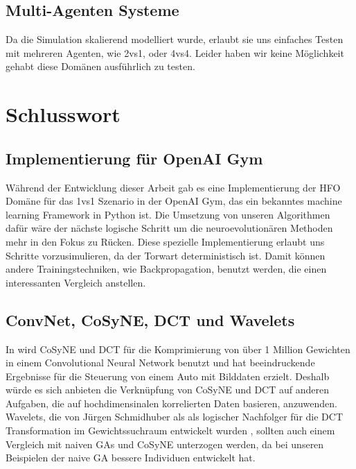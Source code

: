         \subsection*{Multi-Agenten Systeme}
            Da die Simulation skalierend modelliert wurde, erlaubt sie uns einfaches Testen mit mehreren Agenten, wie 2vs1, oder 4vs4. Leider haben wir keine Möglichkeit gehabt diese Domänen ausführlich zu testen. 

\newpage

    \section{Schlusswort}

        \subsection*{Implementierung für OpenAI Gym}
            Während der Entwicklung dieser Arbeit gab es eine Implementierung der HFO Domäne für das 1vs1 Szenario in der OpenAI Gym, das ein bekanntes machine learning Framework in Python ist. Die Umsetzung von unseren Algorithmen dafür wäre der nächste logische Schritt um die neuroevolutionären Methoden mehr in den Fokus zu Rücken. Diese spezielle Implementierung erlaubt uns Schritte vorzusimulieren, da der Torwart deterministisch ist. Damit können andere Trainingstechniken, wie Backpropagation, benutzt werden, die einen interessanten Vergleich anstellen.

        \subsection*{ConvNet, CoSyNE, DCT und Wavelets}
            In \cite{cosyne4} wird CoSyNE und DCT für die Komprimierung von über 1 Million Gewichten in einem Convolutional Neural Network benutzt und hat beeindruckende Ergebnisse für die Steuerung von einem Auto mit Bilddaten erzielt. Deshalb würde es sich anbieten die Verknüpfung von CoSyNE und DCT auf anderen Aufgaben, die auf hochdimensinalen korrelierten Daten basieren, anzuwenden. \\

            \noindent
            Wavelets, die von Jürgen Schmidhuber als als logischer Nachfolger für die DCT Transformation im Gewichtssuchraum entwickelt wurden \cite{wavelet}, sollten auch einem Vergleich mit naiven GAs und CoSyNE unterzogen werden, da bei unseren Beispielen der naive GA bessere Individuen entwickelt hat.

